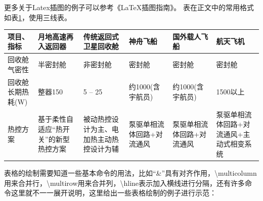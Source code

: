 \begin{figure}[!ht]
	\centering
\end{figure}
更多关于Latex插图的例子可以参考《\LaTeX 插图指南》。
表在正文中的常用格式如表\ref{tab3:category}，使用三线表。\par
\begin{table}[!ht]
	\small
	\centering
	 \label{tab3:category}
	\begin{tabular}{m{5em}<{\centering}m{5em}<{\centering}m{5em}<{\centering}m{5em}<{\centering}m{5em}<{\centering}m{5em}<{\centering}}
		\toprule[2pt]
		项目、指标 &月地高速再入返回器&传统返回式卫星回收舱&神舟飞船&国外载人飞船&航天飞机 \\
		\midrule[1pt]
		回收舱气密性&半密封舱&非密封舱&密封舱&密封舱&密封舱\\
		回收舱长期热耗(W)&整器150&5 – 25&约1000(含宇航员)&约1000(含宇航员)&1500以上\\
		热控方案&基于柔性自适应“热开关”的新型热控方案&被动热控设计为主、电加热主动热控设计为辅&泵驱单相流体回路+对流通风&泵驱单相流体回路+对流通风&泵驱单相流体回路+对流通风+主动式相变系统\\
		\bottomrule[2pt]
	\end{tabular}
\end{table}
表格的绘制需要知道一些基本命令的用法，比如“\&”具有对齐作用，\textbackslash multicolumn用来合并行，\textbackslash multirow用来合并列，\textbackslash hline表示加入横线进行分隔，还有许多命令这里就不一一展开说明，这里给出一些表格绘制的例子进行示范：
